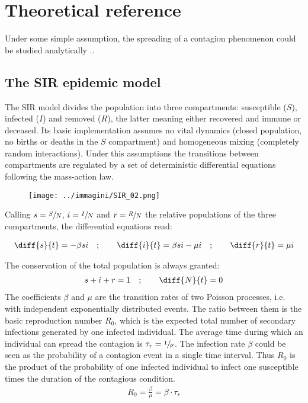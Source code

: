 \documentclass[DIV=12, BCOR=0pt]{scrartcl}  %
\begin{document}
  
  \section{Theoretical reference}
  
  Under some simple assumption, the spreading of a contagion phenomenon could be studied analytically ..
  
  
  \subsection{The SIR epidemic model}
  The SIR model divides the population into three compartments: susceptible ($S$), infected ($I$) and removed ($R$), the latter meaning either recovered and immune or deceased. Its basic implementation assumes no vital dynamics (closed population, no births or deaths in the $S$ compartment) and homogeneous mixing (completely random interactions). Under this assumptions the transitions between compartments are regulated by a set of deterministic differential equations following the mass-action law. 
    
  \begin{figure}[h!]
  	\centering
  	\texttt{[image: ../immagini/SIR\_02.png]}
  	\caption{ }
  	\label{fig:SIRoverall}
  \end{figure}

  Calling $s = \sfrac{S}{N}$, $i = \sfrac{I}{N}$ and $r = \sfrac{R}{N}$ the relative populations of the three compartments, the differential equations read:
  
  \begin{align}
  	\diff{s}{t} = - \beta s i \quad;  \qquad 	\diff{i}{t} = \beta s i - \mu i \quad; \qquad  \diff{r}{t} = \mu i
  	\label{eq:sir}
  \end{align}
  
  The conservation of the total population is always granted: %
  \begin{align}
  	s + i + r = 1 \quad ; \qquad \diff{N}{t}= 0
  	\label{eq:sir_sum}
  \end{align}
  The coefficients $\beta$ and $\mu$ are the transition rates of two Poisson processes, i.e. with independent exponentially distributed events. The ratio between them is the basic reproduction number $R_0$, which is the expected total number of secondary infections generated by one infected individual.   
  The average time during which an individual can spread the contagion is $\tau_{r} = \sfrac{1}{\mu}$. The infection rate $\beta$ could be seen as the probability of a contagion event in a single time interval. Thus $R_0$ is the product of the probability of one infected individual to infect one susceptible times the duration of the contagious condition.
  \begin{align}
			R_0 = \frac{\beta}{\mu} = \beta \cdot \tau_{r}
			\label{eq:R0}
  \end{align}
  
\end{document}

